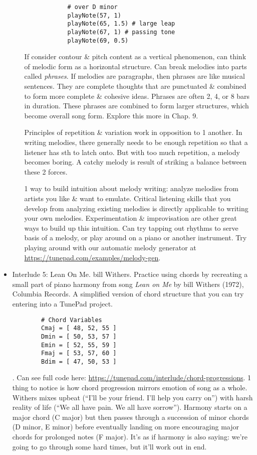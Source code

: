 \documentclass{article}
\begin{document}
\begin{itemize}
\begin{itemize}
\begin{verbatim}
			# over D minor
			playNote(57, 1)
			playNote(65, 1.5) # large leap
			playNote(67, 1) # passing tone
			playNote(69, 0.5)
		\end{verbatim}
		If consider contour \& pitch content as a vertical phenomenon, can think of melodic form as a horizontal structure. Can break melodies into parts called {\it phrases}. If melodies are paragraphs, then phrases are like musical sentences. They are complete thoughts that are punctuated \& combined to form more complete \& cohesive ideas. Phrases are often 2, 4, or 8 bars in duration. These phrases are combined to form larger structures, which become overall song form. Explore this more in Chap. 9.
		
		Principles of repetition \& variation work in opposition to 1 another. In writing melodies, there generally needs to be enough repetition so that a listener has sth to latch onto. But with too much repetition, a melody becomes boring. A catchy melody is result of striking a balance between these 2 forces.
		
		1 way to build intuition about melody writing: analyze melodies from artists you like \& want to emulate. Critical listening skills that you develop from analyzing existing melodies is directly applicable to writing your own melodies. Experimentation \& improvisation are other great ways to build up this intuition. Can try tapping out rhythms to serve basis of a melody, or play around on a piano or another instrument. Try playing around with our automatic melody generator at \url{https://tunepad.com/examples/melody-gen}.
	\end{itemize}
	\item {\sf Interlude 5: Lean On Me. {\sc bill Withers}.} Practice using chords by recreating a small part of piano harmony from song {\it Lean on Me} by {\sc bill Withers} (1972), Columbia Records. A simplified version of chord structure that you can try entering into a TunePad project.
	\begin{verbatim}
		# Chord Variables
		Cmaj = [ 48, 52, 55 ]
		Dmin = [ 50, 53, 57 ]
		Emin = [ 52, 55, 59 ]
		Fmaj = [ 53, 57, 60 ]
		Bdim = [ 47, 50, 53 ]
	\end{verbatim}
	{}. Can see full code here: \url{https://tunepad.com/interlude/chord-progressions}. 1 thing to notice is how chord progression mirrors emotion of song as a whole. {\sc Withers} mixes upbeat (``I'll be your friend. I'll help you carry on'') with harsh reality of life (``We all have pain. We all have sorrow''). Harmony starts on a major chord (C major) but then passes through a succession of minor chords (D minor, E minor) before eventually landing on more encouraging major chords for prolonged notes (F major). It's as if harmony is also saying: we're going to go through some hard times, but it'll work out in end.
	

\end{itemize}
\end{document}
